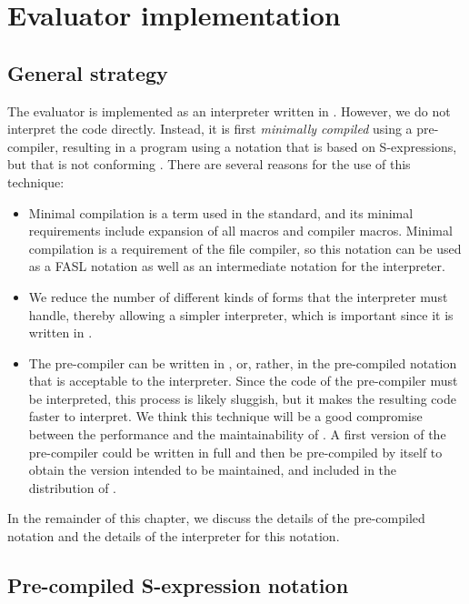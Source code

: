 \chapter{Evaluator implementation}
\label{chap-evaluator-implementation}

\section{General strategy}
\label{sec-evaluator-implementation-general-strategy}

The evaluator is implemented as an interpreter written in
\clanguage{}.  However, we do not interpret the \commonlisp{} code
directly.  Instead, it is first \emph{minimally compiled} using a
pre-compiler, resulting in a program using a notation that is based on
S-expressions, but that is not conforming \commonlisp{}.  There are
several reasons for the use of this technique:

\begin{itemize}
\item Minimal compilation is a term used in the \commonlisp{}
  standard, and its minimal requirements include expansion of all
  macros and compiler macros.  Minimal compilation is a requirement of
  the file compiler, so this notation can be used as a FASL notation
  as well as an intermediate notation for the interpreter.
\item We reduce the number of different kinds of forms that the
  interpreter must handle, thereby allowing a simpler interpreter,
  which is important since it is written in \clanguage{}.
\item The pre-compiler can be written in \commonlisp{}, or, rather, in
  the pre-compiled notation that is acceptable to the interpreter.
  Since the code of the pre-compiler must be interpreted, this process
  is likely sluggish, but it makes the resulting code faster to
  interpret.  We think this technique will be a good compromise
  between the performance and the maintainability of \sysname{}.
  A first version of the pre-compiler could be written in full
  \commonlisp{} and then be pre-compiled by itself to obtain the
  version intended to be maintained, and included in the distribution
  of \sysname{}.
\end{itemize}

In the remainder of this chapter, we discuss the details of the
pre-compiled notation and the details of the interpreter for this
notation.

\section{Pre-compiled S-expression notation}

